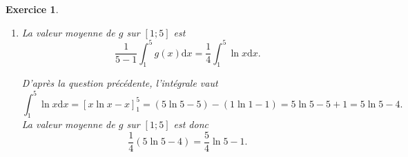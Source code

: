 \documentclass[10pt]{article}
\newtheorem{exo}{Exercice}
\begin{document}
\begin{exo}
\begin{enumerate}
\begin{enumerate}
\begin{align*}
G'(x)&=1\times \ln x+x\times \frac{1}{x}-1\\
&=\ln x+1-1\\
&=\ln x.
\end{align*}

La fonction $G$ est donc bien une primitive de la fonction $g.$ 

\item La valeur moyenne de $g$ sur $\left[1;5\right]$ est
\[ \frac{1}{5-1}\int_1^{5} g(x)\mathrm{d}x=\frac{1}{4}\int_1^{5} \ln x\mathrm{d}x.\]

D'après la question précédente, l'intégrale vaut
\[\int_1^{5} \ln x\mathrm{d}x=\left[x\ln x-x\right]_1^5=\left(5\ln 5-5\right)-\left(1\ln 1-1\right)=5\ln 5-5+1=5\ln 5-4.\] La valeur moyenne de $g$ sur $\left[1;5\right]$ est donc
\[\frac{1}{4}\left(5\ln 5-4\right)=\frac{5}{4}\ln 5-1.\]
\end{enumerate}
\end{enumerate}


\end{exo}
\end{document}
